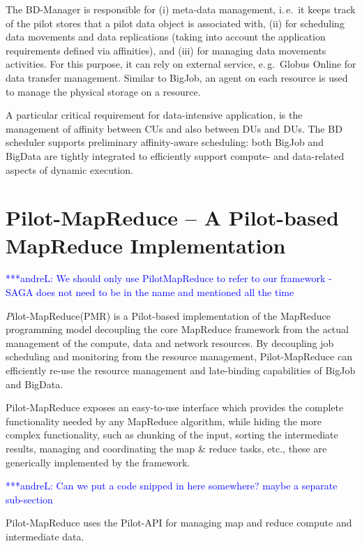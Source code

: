 \documentclass{acm_proc_article-sp}
\newcommand{\alnote}[1]{ {\textcolor{blue} { ***andreL: #1 }}}
\newcommand{\alnote}[1]{}
\newcommand{\pilot}{Pilot\xspace}
\newcommand{\pilotmapreduce}{Pilot-MapReduce\xspace}
\begin{document}
The BD-Manager is responsible for (i) meta-data management, i.\,e.\ it
keeps track of the pilot stores that a pilot data object is associated
with, (ii) for scheduling data movements and data replications (taking
into account the application requirements defined via affinities), and
(iii) for managing data movements activities. For this purpose, it can rely
on external service, e.\,g.\ Globus Online for data transfer management.  
Similar to BigJob, an agent on each resource is used to manage the physical 
storage on a resource.  

A particular critical requirement for data-intensive application, is
the management of affinity between CUs and also between DUs and
DUs. The BD scheduler supports preliminary affinity-aware
scheduling: both BigJob and BigData are tightly integrated to
efficiently support compute- and data-related aspects of dynamic
execution.


\section{Pilot-MapReduce -- A Pilot-based MapReduce Implementation}
\alnote{We should only use PilotMapReduce to refer to our framework - SAGA does not need to be in the name and mentioned all the time}


{\emph \pilotmapreduce (PMR)} is a \pilot-based implementation of the 
MapReduce programming model decoupling the core MapReduce framework from the 
actual management of the compute, data and network resources. By decoupling 
job scheduling and monitoring from the resource management, \pilotmapreduce 
can efficiently re-use the resource management and late-binding capabilities 
of BigJob and BigData.

\pilotmapreduce exposes an easy-to-use interface which provides the complete
functionality needed by any MapReduce algorithm, while hiding the more complex
functionality, such as chunking of the input, sorting the intermediate
results, managing and coordinating the map \& reduce tasks, etc., these are generically
implemented by the framework.

\alnote{Can we put a code snipped in here somewhere? maybe a separate sub-section}

\pilotmapreduce uses the Pilot-API for managing map and reduce compute and intermediate data.

\end{document}
